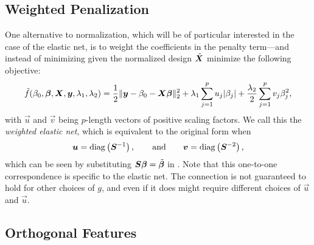 \subsection{Weighted Penalization}\label{sec:weighted-elasticnet}

One alternative to normalization, which will be of particular interested in the case of the
elastic net, is to weight the coefficients in the penalty term---and instead of minimizing
 given the normalized design \(\tilde{\boldsymbol{X}}\) minimize the
following objective:
\[
  \tilde{f}(\beta_0, \boldsymbol{\beta}, \boldsymbol{X}, \boldsymbol{y}, \lambda_1, \lambda_2) =
  \frac{1}{2} \lVert \boldsymbol{y} - \beta_0 - \boldsymbol{X}\boldsymbol{\beta}\rVert_2^2 + \lambda_1 \sum_{j=1}^p u_j |\beta_j| + \frac{\lambda_2}{2} \sum_{j=1}^p v_j \beta_j^2,
\]
with \(\vec{u}\) and \(\vec{v}\) being \(p\)-length vectors of positive scaling factors. We
call this the \emph{weighted elastic net}, which is equivalent to the original form when
\begin{equation}
  \label{eq:weighted-normal-equivalence}
  \boldsymbol{u} = \operatorname{diag}\left(\boldsymbol{S}^{-1}\right), \qquad \text{and}\qquad \boldsymbol{v} = \operatorname{diag}\left(\boldsymbol{S}^{-2}\right),
\end{equation}
which can be seen by substituting \(\boldsymbol{S}\boldsymbol{\beta} = \tilde{\boldsymbol{\beta}}\) in . Note that this one-to-one correspondence is specific to the elastic net. The connection is not guaranteed to hold for other choices of \(g\), and even if it does might require different choices of \(\vec{u}\) and \(\vec{u}\).

\subsection{Orthogonal Features}

